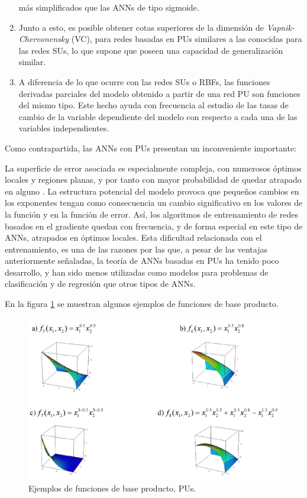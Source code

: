 \begin{enumerate}
	más simplificados que las ANNs de tipo sigmoide.
	\item Junto a esto, es posible obtener cotas superiores de la dimensión
	de \textit{Vapnik-Chervonensky} (VC), para redes basadas en PUs similares a las
	conocidas para las	redes SUs, lo que supone que poseen una capacidad de
	generalización similar.
	\item A diferencia de lo que ocurre con las redes SUs o RBFs,
	las	funciones derivadas parciales del modelo obtenido a partir de una red PU
	son funciones	del   mismo tipo. Este hecho ayuda con frecuencia al estudio de las
	tasas de cambio de la   variable dependiente  del  modelo  con  respecto  a  cada  una
	de  las  variables independientes.
\end{enumerate}

Como  contrapartida,  las  ANNs  con  PUs  presentan  un  inconveniente
importante:

La  superficie  de error  asociada  es  especialmente  compleja,  con  numerosos  óptimos
locales  y regiones  planas,  y  por tanto  con  mayor  probabilidad  de  quedar  atrapado
en  alguno \cite{Ismail2000}.  La  estructura potencial  del  modelo provoca  que
pequeños cambios en los exponentes  tengan  como  consecuencia  un cambio significativo
en los  valores  de la  función  y  en  la  función  de  error.  Así, los  algoritmos  de
entrenamiento de redes basados en el gradiente quedan con frecuencia, y de forma especial
en este tipo de ANNs, atrapados en óptimos locales. Esta dificultad
relacionada con
el entrenamiento, es una de las razones por las que, a pesar de las ventajas anteriormente
señaladas, la teoría de ANNs basadas  en  PUs  ha  tenido  poco
desarrollo,  y  han  sido  menos utilizadas  como modelos para problemas de
clasificación y de regresión que otros tipos de ANNs.

En la figura \ref{ejemploProducto} se muestran algunos ejemplos de funciones de base
producto.

\begin{figure}[htb]
\centering
\includegraphics[keepaspectratio,width=12.5cm]{figuras/ejemploProducto.jpg}
\caption{Ejemplos de funciones de base producto, PUs.}
\label{ejemploProducto}
\end{figure}


